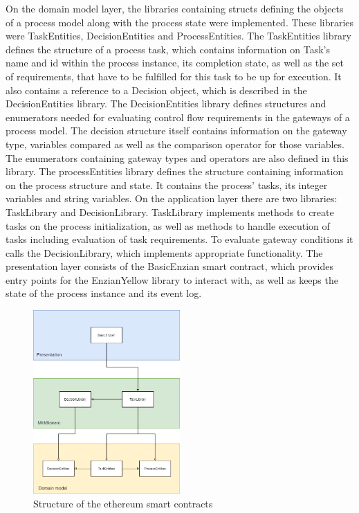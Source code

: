 On the domain model layer, the libraries containing structs defining the objects of a process model along with the process state were implemented. These libraries were TaskEntities, DecisionEntities and ProcessEntities.\newline
The TaskEntities library defines the structure of a process task, which contains information on Task's name and id within the process instance, its completion state, as well as the set of requirements, that have to be fulfilled for this task to be up for execution. It also contains a reference to a Decision object, which is described in the DecisionEntities library.\newline
The DecisionEntities library defines structures and enumerators needed for evaluating control flow requirements in the gateways of a process model. The decision structure itself contains information on the gateway type, variables compared as well as the comparison operator for those variables. The enumerators containing gateway types and operators are also defined in this library.\newline
The processEntities library defines the structure containing information on the process structure and state. It contains the process' tasks, its integer variables and string variables.\newline
On the application layer there are two libraries: TaskLibrary and DecisionLibrary. TaskLibrary implements methods to create tasks on the process initialization, as well as methods to handle execution of tasks including evaluation of task requirements. To evaluate gateway conditions it calls the DecisionLibrary, which implements appropriate functionality.\newline
The presentation layer consists of the BasicEnzian smart contract, which provides entry points for the EnzianYellow library to interact with, as well as keeps the state of the process instance and its event log. 

\begin{figure}[h]
	\centering
	\includegraphics[width=0.5\textwidth]{gfx/eth-contracts}
	\caption{Structure of the ethereum smart contracts}
	\label{fig:impr:eth:contracts}
\end{figure}

